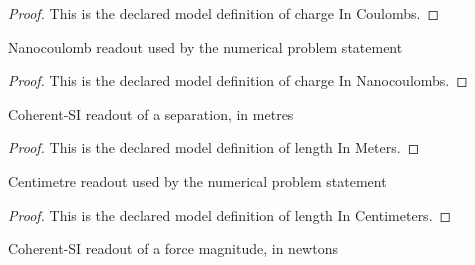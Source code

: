 \begin{proof}
  This is the declared model definition of charge In Coulombs.
\end{proof}
\begin{definition}
  \label{def:physics:phyx-mini-0992:phyxminiproblems-problemphyxmini0992-chargeinnanocoulombs}
  Nanocoulomb readout used by the numerical problem statement
\end{definition}
\begin{proof}
  This is the declared model definition of charge In Nanocoulombs.
\end{proof}
\begin{definition}
  \label{def:physics:phyx-mini-0992:phyxminiproblems-problemphyxmini0992-lengthinmeters}
  Coherent-SI readout of a separation, in metres
\end{definition}
\begin{proof}
  This is the declared model definition of length In Meters.
\end{proof}
\begin{definition}
  \label{def:physics:phyx-mini-0992:phyxminiproblems-problemphyxmini0992-lengthincentimeters}
  Centimetre readout used by the numerical problem statement
\end{definition}
\begin{proof}
  This is the declared model definition of length In Centimeters.
\end{proof}
\begin{definition}
  \label{def:physics:phyx-mini-0992:phyxminiproblems-problemphyxmini0992-forcemagnitudeinnewtons}
  Coherent-SI readout of a force magnitude, in newtons
\end{definition}
